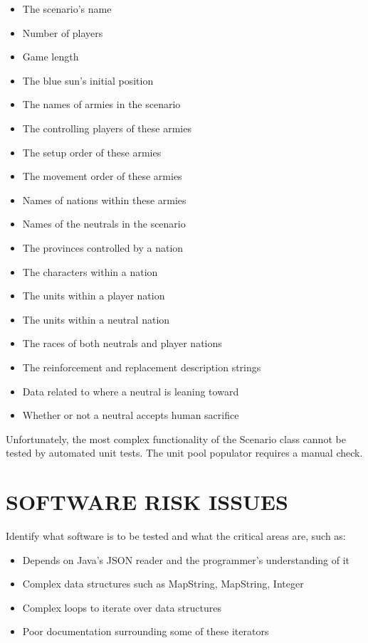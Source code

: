 {\color{black}
\begin{itemize}
\item The scenario's name
\item Number of players
\item Game length
\item The blue sun's initial position
\item The names of armies in the scenario
\item The controlling players of these armies
\item The setup order of these armies
\item The movement order of these armies
\item Names of nations within these armies
\item Names of the neutrals in the scenario
\item The provinces controlled by a nation
\item The characters within a nation
\item The units within a player nation
\item The units within a neutral nation
\item The races of both neutrals and player nations
\item The reinforcement and replacement description strings
\item Data related to where a neutral is leaning toward
\item Whether or not a neutral accepts human sacrifice
\end{itemize}
}

{\color{black}
Unfortunately, the most complex functionality of the Scenario class 
cannot be tested by automated unit tests. The unit pool populator requires 
a manual check. }

\section[SOFTWARE RISK ISSUES]{\bfseries\color{black} SOFTWARE RISK ISSUES}
{\color{black}

Identify what software is to be tested and what the critical areas
are, such as:

\begin{itemize}
\item Depends on Java's JSON reader and the programmer's understanding of it
\item Complex data structures such as Map\<String, Map\<String, Integer\>\>
\item Complex loops to iterate over data structures
\item Poor documentation surrounding some of these iterators
\end{itemize}
}

